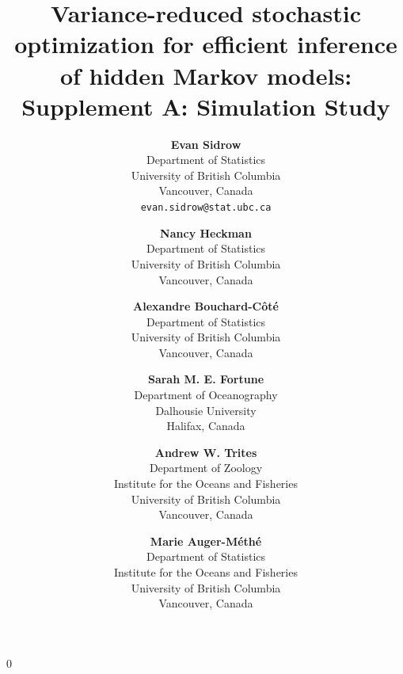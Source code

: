 \documentclass[12pt]{article}
\newcommand{\blind}{0}
\begin{document}
%

\def\spacingset#1{\renewcommand{\baselinestretch}%
{#1}\small\normalsize} \spacingset{1}


\blind
{
    \title{Variance-reduced stochastic optimization for efficient inference of hidden Markov models: Supplement A: Simulation Study}
    
    \author{
      \textbf{Evan Sidrow} \\
      Department of Statistics \\
      University of British Columbia\\
      Vancouver, Canada \\
    \texttt{evan.sidrow@stat.ubc.ca} \\
      \and
      \textbf{Nancy Heckman} \\
      Department of Statistics \\
      University of British Columbia \\
      Vancouver, Canada \\
      \and
      \textbf{Alexandre Bouchard-C\^ot\'e} \\
      Department of Statistics \\
      University of British Columbia \\
      Vancouver, Canada \\
      \and
      \textbf{Sarah M. E. Fortune} \\
      Department of Oceanography \\
      Dalhousie University \\
      Halifax, Canada \\
      \and
      \textbf{Andrew W. Trites} \\
      Department of Zoology \\
      Institute for the Oceans and Fisheries \\
      University of British Columbia \\
      Vancouver, Canada \\
      \and
      \textbf{Marie Auger-M\'eth\'e} \\
      Department of Statistics \\
      Institute for the Oceans and Fisheries \\
      University of British Columbia \\
      Vancouver, Canada \\
    }
    \maketitle
} \fi
\end{document}

